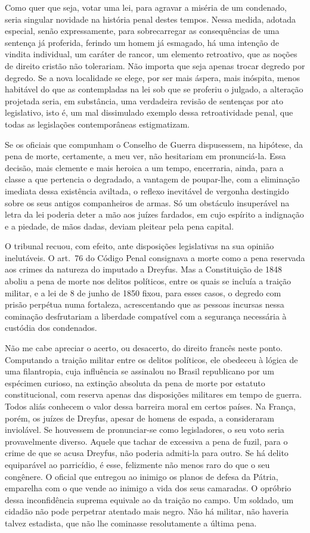 Como quer que seja, votar uma lei, para agravar a miséria de um
condenado, seria singular novidade na história penal destes tempos.
Nessa medida, adotada especial, senão expressamente, para
sobrecarregar as consequências de uma sentença já proferida, ferindo
um homem já esmagado, há uma intenção de vindita individual, um caráter
de rancor, um elemento retroativo, que as noções de direito cristão não
tolerariam. Não importa que seja apenas trocar degredo por degredo. Se
a nova localidade se elege, por ser mais áspera, mais inóspita, menos
habitável do que as contempladas na lei sob que se proferiu o julgado,
a alteração projetada seria, em substância, uma verdadeira revisão de
sentenças por ato legislativo, isto é, um mal dissimulado exemplo dessa
retroatividade penal, que todas as legislações contemporâneas
estigmatizam.

Se os oficiais que compunham o Conselho de Guerra dispusessem, na
hipótese, da pena de morte, certamente, a meu ver, não hesitariam em
pronunciá-la. Essa decisão, mais clemente e mais heroica a um tempo,
encerraria, ainda, para a classe a que pertencia o degradado, a
vantagem de poupar-lhe, com a eliminação imediata dessa existência
aviltada, o reflexo inevitável de vergonha destingido sobre os seus
antigos companheiros de armas. Só um obstáculo insuperável na letra da
lei poderia deter a mão aos juízes fardados, em cujo espírito a
indignação e a piedade, de mãos dadas, deviam pleitear pela pena capital.

O tribunal recuou, com efeito, ante disposições legislativas na sua
opinião inelutáveis. O art.~76 do Código Penal consignava a morte como
a pena reservada aos crimes da natureza do imputado a Dreyfus. Mas a
Constituição de 1848 aboliu a pena de morte nos delitos políticos,
entre os quais se incluía a traição militar, e a lei de 8 de junho de
1850 fixou, para esses casos, o degredo com prisão perpétua numa
fortaleza, acrescentando que as pessoas incursas nessa 
cominação desfrutariam a liberdade compatível com a segurança necessária à
custódia dos condenados.

Não me cabe apreciar o acerto, ou desacerto, do direito francês neste
ponto. Computando a traição militar entre os delitos políticos, ele
obedeceu à lógica de uma filantropia, cuja influência se assinalou no
Brasil republicano por um espécimen curioso, na extinção absoluta da
pena de morte por estatuto constitucional, com reserva apenas das
disposições militares em tempo de guerra. Todos aliás conhecem o valor
dessa barreira moral em certos países. Na França, porém, os juízes de
Dreyfus, apesar de homens de espada, a consideraram inviolável. Se
houvessem de pronunciar-se como legisladores, o seu voto seria
provavelmente diverso. Aquele que tachar de excessiva a pena de fuzil,
para o crime de que se acusa Dreyfus, não poderia admiti-la para
outro. Se há delito equiparável ao parricídio, é esse, felizmente não
menos raro do que o seu congênere. O oficial que entregou ao inimigo os
planos de defesa da Pátria, emparelha com o que vende ao inimigo a vida
dos seus camaradas. O opróbrio dessa inconfidência suprema equivale ao
da traição no campo. Um soldado, um cidadão não pode perpetrar atentado
mais negro. Não há militar, não haveria talvez estadista, que não lhe
cominasse resolutamente a última pena.

